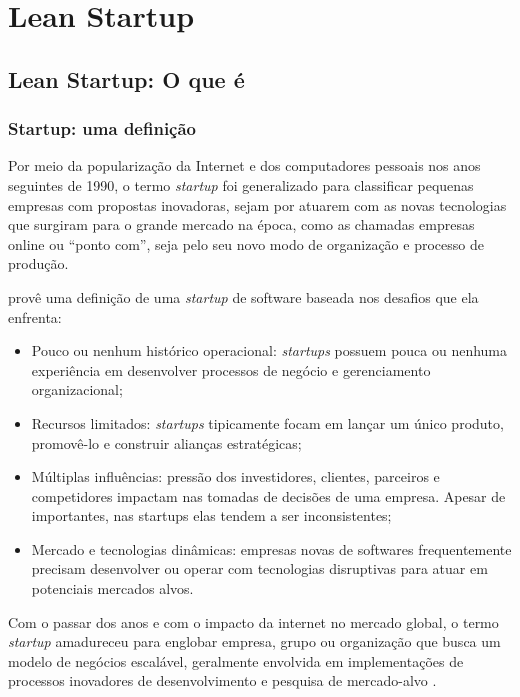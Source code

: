 \chapter{Lean Startup}
\label{cap:leanstartup}
\section{Lean Startup: O que é}
\subsection{Startup: uma definição}
\par Por meio da popularização da Internet e dos computadores pessoais nos anos seguintes de 1990, o termo \emph{startup} foi generalizado para classificar pequenas empresas com propostas inovadoras, sejam por atuarem com as novas tecnologias que surgiram para o grande mercado na época, como as chamadas empresas online ou ``ponto com'', seja pelo seu novo modo de organização e processo de produção.
\par \cite{nicolo:14} provê uma definição de uma \emph{startup} de software baseada nos desafios que ela enfrenta:
\begin{itemize}
\item Pouco ou nenhum histórico operacional: \emph{startups} possuem pouca ou nenhuma experiência em desenvolver processos de negócio e gerenciamento organizacional;
\item Recursos limitados: \emph{startups} tipicamente focam em lançar um único produto, promovê-lo e construir alianças estratégicas;
\item Múltiplas influências: pressão dos investidores, clientes, parceiros e competidores impactam nas tomadas de decisões de uma empresa. Apesar de importantes, nas startups elas tendem a ser inconsistentes;
\item Mercado e tecnologias dinâmicas: empresas novas de softwares frequentemente precisam desenvolver ou operar com tecnologias disruptivas para atuar em potenciais mercados alvos.
\end{itemize}

\par Com o passar dos anos e com o impacto da internet no mercado global, o termo \emph{startup} amadureceu para englobar empresa, grupo ou organização que busca um modelo de negócios escalável, geralmente envolvida em implementações de processos inovadores de desenvolvimento e pesquisa de mercado-alvo \citep{blank:03}.

